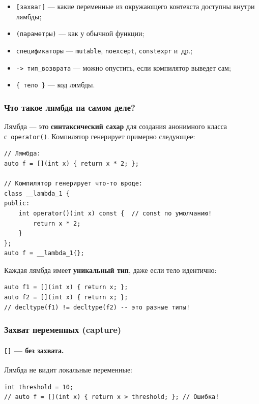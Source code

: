 \documentclass[a4paper,12pt]{article}
\begin{document}
\begin{itemize}
    \item \texttt{[захват]} --- какие переменные из окружающего контекста доступны внутри лямбды;
    \item \texttt{(параметры)} --- как у обычной функции;
    \item \texttt{спецификаторы} --- \texttt{mutable}, \texttt{noexcept}, \texttt{constexpr} и~др.;
    \item \texttt{-> тип\_возврата} --- можно опустить, если компилятор выведет сам;
    \item \texttt{\{ тело \}} --- код лямбды.
\end{itemize}

\subsubsection{Что такое лямбда на самом деле?}

Лямбда --- это \textbf{синтаксический сахар} для создания анонимного класса
с~\texttt{operator()}. Компилятор генерирует примерно следующее:

\begin{lstlisting}
// Лямбда:
auto f = [](int x) { return x * 2; };

// Компилятор генерирует что-то вроде:
class __lambda_1 {
public:
    int operator()(int x) const {  // const по умолчанию!
        return x * 2;
    }
};
auto f = __lambda_1{};
\end{lstlisting}

Каждая лямбда имеет \textbf{уникальный тип}, даже если тело идентично:

\begin{lstlisting}
auto f1 = [](int x) { return x; };
auto f2 = [](int x) { return x; };
// decltype(f1) != decltype(f2) -- это разные типы!
\end{lstlisting}

\subsubsection{Захват переменных (capture)}

\paragraph{\texttt{[]} --- без захвата.} Лямбда не видит локальные переменные:

\begin{lstlisting}
int threshold = 10;
// auto f = [](int x) { return x > threshold; }; // Ошибка!
\end{lstlisting}
\end{document}
